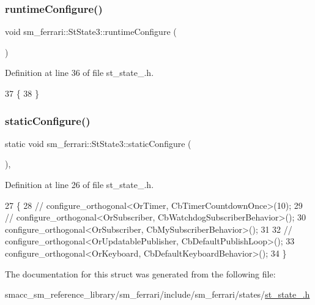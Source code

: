 \subsubsection{\texorpdfstring{runtime\+Configure()}{runtimeConfigure()}}
{\footnotesize\ttfamily void sm\+\_\+ferrari\+::\+St\+State3\+::runtime\+Configure (\begin{DoxyParamCaption}{ }\end{DoxyParamCaption})\hspace{0.3cm}{\ttfamily [inline]}}



Definition at line 36 of file st\+\_\+state\+\_.\+h.


\begin{DoxyCode}
37     \{
38     \}
\end{DoxyCode}
\mbox{\label{structsm__ferrari_1_1StState3_af8e946a7e28a4b5dbc43615a3e83b9db}} 
\subsubsection{\texorpdfstring{static\+Configure()}{staticConfigure()}}
{\footnotesize\ttfamily static void sm\+\_\+ferrari\+::\+St\+State3\+::static\+Configure (\begin{DoxyParamCaption}{ }\end{DoxyParamCaption})\hspace{0.3cm}{\ttfamily [inline]}, {\ttfamily [static]}}



Definition at line 26 of file st\+\_\+state\+\_.\+h.


\begin{DoxyCode}
27     \{
28         \textcolor{comment}{// configure\_orthogonal<OrTimer, CbTimerCountdownOnce>(10);}
29         \textcolor{comment}{// configure\_orthogonal<OrSubscriber, CbWatchdogSubscriberBehavior>();}
30         configure\_orthogonal<OrSubscriber, CbMySubscriberBehavior>();
31 
32         \textcolor{comment}{// configure\_orthogonal<OrUpdatablePublisher, CbDefaultPublishLoop>();}
33         configure\_orthogonal<OrKeyboard, CbDefaultKeyboardBehavior>();
34     \}
\end{DoxyCode}


The documentation for this struct was generated from the following file\+:\begin{DoxyCompactItemize}
\item 
smacc\+\_\+sm\+\_\+reference\+\_\+library/sm\+\_\+ferrari/include/sm\+\_\+ferrari/states/\hyperlink{sm__ferrari_2include_2sm__ferrari_2states_2st__state__3_8h}{st\+\_\+state\+\_.\+h}\end{DoxyCompactItemize}
